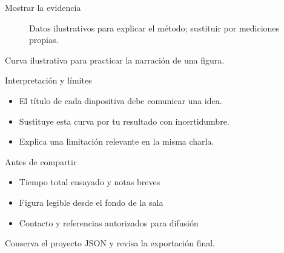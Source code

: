 \documentclass[aspectratio=169,11pt]{beamer}
\begin{document}
\begin{frame}{Mostrar la evidencia}
  \transdissolve[duration=0.25]
  \begin{figure}
    \centering
    \caption{Datos ilustrativos para explicar el método; sustituir por mediciones propias.}
  \end{figure}
  \medskip

  {\small Curva ilustrativa para practicar la narración de una figura.}
\end{frame}

\begin{frame}{Interpretación y límites}
  \transdissolve[duration=0.25]
  \begin{itemize}
    \item El título de cada diapositiva debe comunicar una idea.
    \item Sustituye esta curva por tu resultado con incertidumbre.
    \item Explica una limitación relevante en la misma charla.
  \end{itemize}
\end{frame}

\begin{frame}{Antes de compartir}
  \transdissolve[duration=0.25]
  \begin{itemize}
    \item Tiempo total ensayado y notas breves
    \item Figura legible desde el fondo de la sala
    \item Contacto y referencias autorizados para difusión
  \end{itemize}
  \medskip

  {\small Conserva el proyecto JSON y revisa la exportación final.}
\end{frame}
\end{document}
